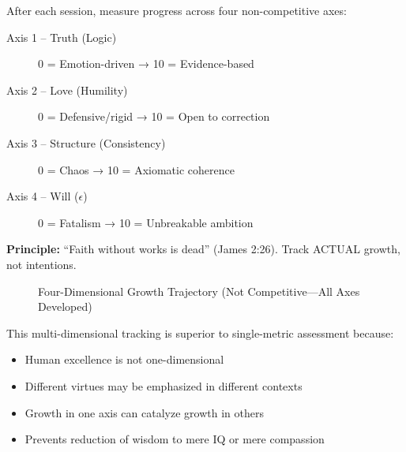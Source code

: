 \documentclass[11pt,a4paper]{article}
\theoremstyle{definition}
\theoremstyle{remark}
\begin{document}
\begin{mdframed}[style=keyprinciple, frametitle={Rule 5: 4D Growth Tracking}]
After each session, measure progress across four non-competitive axes:

\begin{description}
    \item[\textcolor{truthred}{Axis 1 – Truth (Logic)}] 0 = Emotion-driven → 10 = Evidence-based
    \item[\textcolor{loverose}{Axis 2 – Love (Humility)}] 0 = Defensive/rigid → 10 = Open to correction
    \item[\textcolor{structuregray}{Axis 3 – Structure (Consistency)}] 0 = Chaos → 10 = Axiomatic coherence
    \item[\textcolor{willorange}{Axis 4 – Will ($\epsilon$)}] 0 = Fatalism → 10 = Unbreakable ambition
\end{description}

\textbf{Principle:} ``Faith without works is dead'' (James 2:26). Track ACTUAL growth, not intentions.
\end{mdframed}

\begin{figure}[H]
\centering
{}
\caption{Four-Dimensional Growth Trajectory (Not Competitive—All Axes Developed)}
\label{fig:4d_growth}
\end{figure}

This multi-dimensional tracking is superior to single-metric assessment because:
\begin{itemize}
    \item Human excellence is not one-dimensional
    \item Different virtues may be emphasized in different contexts
    \item Growth in one axis can catalyze growth in others
    \item Prevents reduction of wisdom to mere IQ or mere compassion
\end{itemize}
\end{document}
